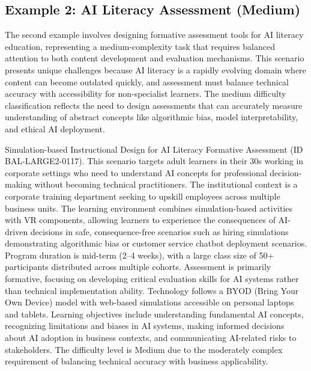\subsection{Example 2: AI Literacy Assessment (Medium)}

The second example involves designing formative assessment tools for AI literacy education, representing a medium-complexity task that requires balanced attention to both content development and evaluation mechanisms. This scenario presents unique challenges because AI literacy is a rapidly evolving domain where content can become outdated quickly, and assessment must balance technical accuracy with accessibility for non-specialist learners. The medium difficulty classification reflects the need to design assessments that can accurately measure understanding of abstract concepts like algorithmic bias, model interpretability, and ethical AI deployment.

\begin{tcolorbox}[colback=green!5!white, colframe=green!50!black, breakable]
\small
Simulation-based Instructional Design for AI Literacy Formative Assessment (ID BAL-LARGE2-0117). This scenario targets adult learners in their 30s working in corporate settings who need to understand AI concepts for professional decision-making without becoming technical practitioners. The institutional context is a corporate training department seeking to upskill employees across multiple business units. The learning environment combines simulation-based activities with VR components, allowing learners to experience the consequences of AI-driven decisions in safe, consequence-free scenarios such as hiring simulations demonstrating algorithmic bias or customer service chatbot deployment scenarios. Program duration is mid-term (2--4 weeks), with a large class size of 50+ participants distributed across multiple cohorts. Assessment is primarily formative, focusing on developing critical evaluation skills for AI systems rather than technical implementation ability. Technology follows a BYOD (Bring Your Own Device) model with web-based simulations accessible on personal laptops and tablets. Learning objectives include understanding fundamental AI concepts, recognizing limitations and biases in AI systems, making informed decisions about AI adoption in business contexts, and communicating AI-related risks to stakeholders. The difficulty level is Medium due to the moderately complex requirement of balancing technical accuracy with business applicability.
\end{tcolorbox}


